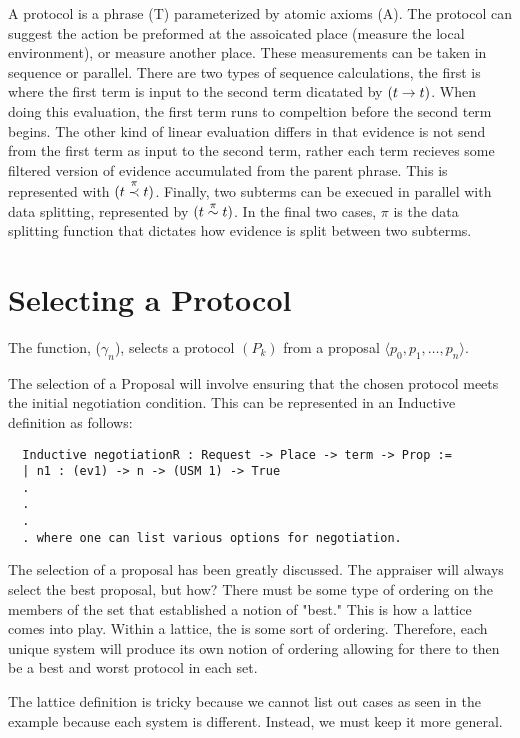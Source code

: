 \documentclass[10pt]{report}
\begin{document}
A protocol is a phrase (T) parameterized by atomic axioms (A).
The protocol can suggest the action be preformed at the assoicated place
(measure the local environment), or measure another place. These
measurements can be taken in sequence or parallel. There are two types of sequence
calculations, the first is where the first term is input
to the second term dicatated by $(t \to t)$.
When doing this evaluation, the first term runs to compeltion
before the second term begins. The other kind of linear evaluation
differs in that evidence is not send from the
first term as input to the second term, rather each term recieves some
filtered version of evidence accumulated from the parent phrase. This
is represented with $(t\stackrel{\pi}{\prec} t)$. Finally, two
subterms can be execued in parallel with data splitting,
represented by $(t\stackrel{\pi}{\sim} t)$. In the final two cases, $\pi$ is the
data splitting function that dictates how evidence is split
between two subterms. 

\section{Selecting a Protocol}

  The function, ($\gamma_{n}$), selects a protocol $(P_{k})$ 
  from a proposal $\langle p_0,p_1,\ldots,p_{n}\rangle$.  

  The selection of a Proposal will involve ensuring that the chosen
  protocol meets the initial negotiation condition. This can be
  represented in an Inductive definition as follows:
  
  \begin{verbatim}
  Inductive negotiationR : Request -> Place -> term -> Prop :=
  | n1 : (ev1) -> n -> (USM 1) -> True
  .
  .
  .
  . where one can list various options for negotiation. 
  \end{verbatim} 
  
  The selection of a proposal has been greatly discussed. The
  appraiser will always select the best proposal, but how? There must be some
  type of ordering on the members of the set that established a notion of
  "best." This is how a lattice comes into play. Within a lattice, the is
  some sort of ordering. Therefore, each unique system will produce its own
  notion of ordering allowing for there to then be a best and worst protocol
  in each set. 
	
  The lattice definition is tricky because we cannot list out cases as
  seen in the example because each system is different. Instead, we must
  keep it more general. 
\end{document}
